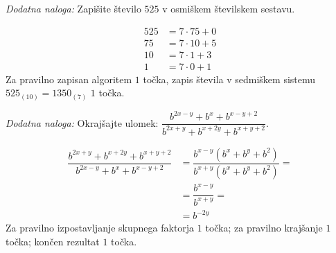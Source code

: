 \documentclass[addpoints,12pt]{exam}
\begin{document}
\begin{questions}
\begin{parts}
        \end{parts}








     \newpage


    \bonusquestion[2]
    \textit{Dodatna naloga:} Zapišite število $525$ v osmiškem številskem sestavu.

    \begin{solution}[9cm]
        \begin{align*}
            525 &= 7\cdot 75 + 0 \\
            75 &= 7\cdot 10 + 5 \\
            10 &= 7\cdot 1 + 3 \\
            1 &= 7\cdot 0 + 1
        \end{align*}
        Za pravilno zapisan algoritem $1$ točka, zapis števila v sedmiškem sistemu $525_{(10)}=1350_{(7)}$ $1$ točka.
    \end{solution}




        

    \bonusquestion[3]
    \textit{Dodatna naloga:} Okrajšajte ulomek: $\dfrac{b^{2x-y}+b^x+b^{x-y+2}}{b^{2x+y}+b^{x+2y}+b^{x+y+2}}$.

    \begin{solution}[7cm]
        \begin{align*}
            \dfrac{b^{2x+y}+b^{x+2y}+b^{x+y+2}}{b^{2x-y}+b^x+b^{x-y+2}} &= \dfrac{b^{x-y}(b^x+b^y+b^2)}{b^{x+y}(b^x+b^y+b^2)}= \\
                                                                        &= \dfrac{b^{x-y}}{b^{x+y}}= \\
                                                                        &= b^{-2y}
        \end{align*}
        Za pravilno izpostavljanje skupnega faktorja $1$ točka; za pravilno krajšanje $1$ točka; končen rezultat $1$ točka.
    \end{solution}




\end{questions}
\end{document}
